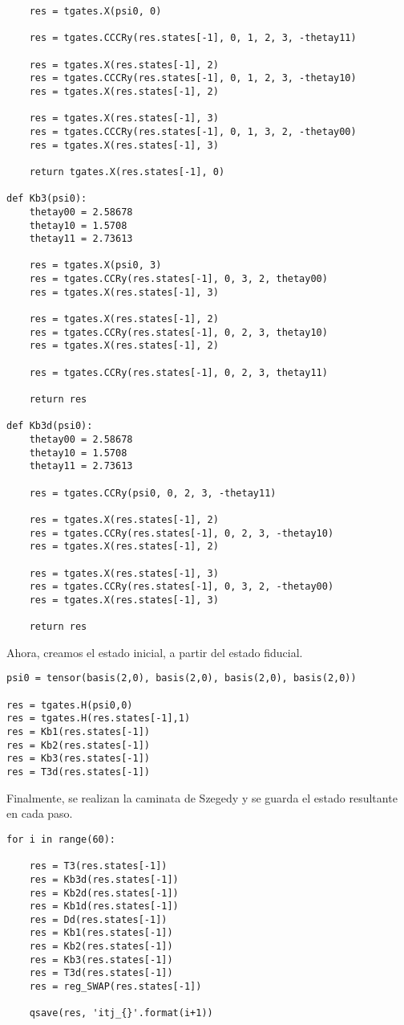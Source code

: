 \begin{verbatim}
    res = tgates.X(psi0, 0)

    res = tgates.CCCRy(res.states[-1], 0, 1, 2, 3, -thetay11)

    res = tgates.X(res.states[-1], 2)
    res = tgates.CCCRy(res.states[-1], 0, 1, 2, 3, -thetay10)
    res = tgates.X(res.states[-1], 2)

    res = tgates.X(res.states[-1], 3)
    res = tgates.CCCRy(res.states[-1], 0, 1, 3, 2, -thetay00)
    res = tgates.X(res.states[-1], 3)

    return tgates.X(res.states[-1], 0)

def Kb3(psi0):
    thetay00 = 2.58678
    thetay10 = 1.5708
    thetay11 = 2.73613

    res = tgates.X(psi0, 3)
    res = tgates.CCRy(res.states[-1], 0, 3, 2, thetay00)
    res = tgates.X(res.states[-1], 3)

    res = tgates.X(res.states[-1], 2)
    res = tgates.CCRy(res.states[-1], 0, 2, 3, thetay10)
    res = tgates.X(res.states[-1], 2)

    res = tgates.CCRy(res.states[-1], 0, 2, 3, thetay11)

    return res

def Kb3d(psi0):
    thetay00 = 2.58678
    thetay10 = 1.5708
    thetay11 = 2.73613

    res = tgates.CCRy(psi0, 0, 2, 3, -thetay11)

    res = tgates.X(res.states[-1], 2)
    res = tgates.CCRy(res.states[-1], 0, 2, 3, -thetay10)
    res = tgates.X(res.states[-1], 2)

    res = tgates.X(res.states[-1], 3)
    res = tgates.CCRy(res.states[-1], 0, 3, 2, -thetay00)
    res = tgates.X(res.states[-1], 3)

    return res
\end{verbatim}

Ahora, creamos el estado inicial, a partir del estado fiducial.

\begin{verbatim}
psi0 = tensor(basis(2,0), basis(2,0), basis(2,0), basis(2,0))

res = tgates.H(psi0,0)
res = tgates.H(res.states[-1],1)
res = Kb1(res.states[-1])
res = Kb2(res.states[-1])
res = Kb3(res.states[-1])
res = T3d(res.states[-1])
\end{verbatim}

Finalmente, se realizan la caminata de Szegedy y se guarda el estado resultante en cada paso.

\begin{verbatim}
for i in range(60):
    
    res = T3(res.states[-1])
    res = Kb3d(res.states[-1])
    res = Kb2d(res.states[-1])
    res = Kb1d(res.states[-1])
    res = Dd(res.states[-1])
    res = Kb1(res.states[-1])
    res = Kb2(res.states[-1])
    res = Kb3(res.states[-1])
    res = T3d(res.states[-1])
    res = reg_SWAP(res.states[-1])
    
    qsave(res, 'itj_{}'.format(i+1))
\end{verbatim}


